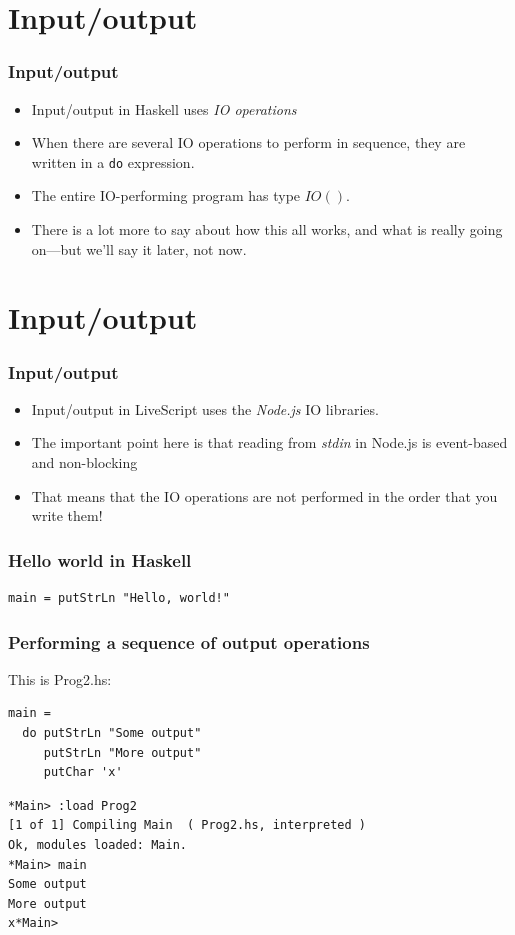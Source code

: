 \documentclass{beamer}
\begin{document}
\section{Input/output}
\begin{frame}[fragile]
\frametitle{Input/output}

\begin{itemize}
\item Input/output in Haskell uses \emph{IO operations}
\item When there are several IO operations to perform in sequence,
  they are written in a \texttt{do} expression.
\item The entire IO-performing program has type $IO ()$.
\item There is a lot more to say about how this all works, and what
  is really going on---but we'll say it later, not now.
\end{itemize}

\end{frame}
\section{Input/output}
\begin{frame}[fragile]
\frametitle{Input/output}

\begin{itemize}
\item Input/output in LiveScript uses the \emph{Node.js} IO libraries.
\item The important point here is that reading from \emph{stdin} in Node.js is event-based and non-blocking
\item That means that the IO operations are not performed in the order that you write them!
\end{itemize}

\end{frame}

\begin{frame}[fragile]
\frametitle{Hello world in Haskell}

\begin{verbatim}
main = putStrLn "Hello, world!"
\end{verbatim}

\end{frame}
\begin{frame}[fragile]
\frametitle{Performing a sequence of output operations}

This is Prog2.hs:
\begin{verbatim}
main =
  do putStrLn "Some output"
     putStrLn "More output"
     putChar 'x'
\end{verbatim}

\begin{verbatim}
*Main> :load Prog2
[1 of 1] Compiling Main  ( Prog2.hs, interpreted )
Ok, modules loaded: Main.
*Main> main
Some output
More output
x*Main> 
\end{verbatim}

\end{frame}
\end{document}
